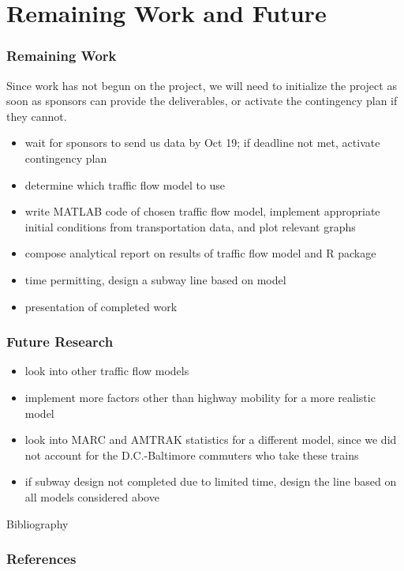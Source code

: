 \documentclass[compress,handout,10pt]{beamer}
\let\olditem\item
\renewcommand{\item}{\setlength{\itemsep}{0.5\baselineskip}\olditem}
\begin{document}
\section{Remaining Work and Future}
\begin{frame}
    \frametitle{Remaining Work}
  Since work has not begun on the project, we will need to initialize the project as soon as sponsors can provide the deliverables, or activate the contingency plan if they cannot.
  \vspace{7pt}
	\begin{itemize}
	\item wait for sponsors to send us data by Oct 19; if deadline not met, activate contingency plan
	\item determine which traffic flow model to use
	\item write MATLAB code of chosen traffic flow model, implement appropriate initial conditions from transportation data, and plot relevant graphs
	\item compose analytical report on results of traffic flow model and R package
	\item time permitting, design a subway line based on model
	\item presentation of completed work
	\end{itemize}
\end{frame}

\begin{frame}
    \frametitle{Future Research}
	\begin{itemize}
	\item look into other traffic flow models
	\item implement more factors other than highway mobility for a more realistic model
	\item look into MARC and AMTRAK statistics for a different model, since we did not account for the D.C.-Baltimore commuters who take these trains
	\item if subway design not completed due to limited time, design the line based on all models considered above
	\end{itemize}
\end{frame}

\begin{frame}[allowframebreaks]{Bibliography}
\frametitle{References}

\nocite{*}

\end{frame}
\end{document}
